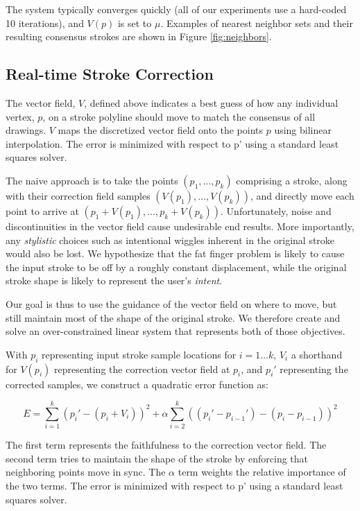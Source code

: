 The system typically converges quickly (all of our experiments use a hard-coded 10 iterations), and $V(p)$ is set to $\mu$.  Examples of nearest neighbor sets and their resulting consensus strokes are shown in Figure \ref{fig:neighbors}.

\subsection{Real-time Stroke Correction}


The vector field, $V$, defined above indicates a best guess of how any individual vertex, $p$, on a stroke polyline should move to match the consensus of all drawings. $V$ maps the discretized vector field onto the points $p$ using bilinear interpolation. The error is minimized with respect to p' using a standard least squares solver.

The naive approach is to take the points $(p_1, \ldots, p_k)$ comprising a stroke, along with their correction field samples $(V(p_1), \ldots, V(p_k))$, and directly move each point to arrive at $(p_1 + V(p_1), \ldots, p_k + V(p_k))$.  Unfortunately, noise and discontinuities in the vector field cause undesirable end results. More importantly, any {\em stylistic} choices such as intentional wiggles inherent in the original stroke would also be lost.  We hypothesize that the fat finger problem is likely to cause the input stroke to be off by a roughly constant displacement, while the original stroke shape is likely to represent the user's {\em intent}.

Our goal is thus to use the guidance of the vector field on where to move, but still maintain most of the shape of the original stroke.  We therefore create and solve an over-constrained linear system that represents both of those objectives.

With $p_i$ representing input stroke sample locations for $i=1\ldots k$, $V_i$ a shorthand for $V(p_i)$ representing the correction vector field at $p_i$, and $p_i'$ representing the corrected samples, we construct a quadratic error function as:

\begin{equation}
E =  \sum_{i=1}^k (p_i' - (p_i + V_i))^2 +  \alpha \sum_{i=2}^k ((p_i' - p_{i-1}') - (p_i - p_{i-1}))^2
\end{equation}

The first term represents the faithfulness to the correction vector field. The second term tries to maintain the shape of the stroke by enforcing that neighboring points move in sync. The $\alpha$ term weights the relative importance of the two terms. The error is minimized with respect to p' using a standard least squares solver.



